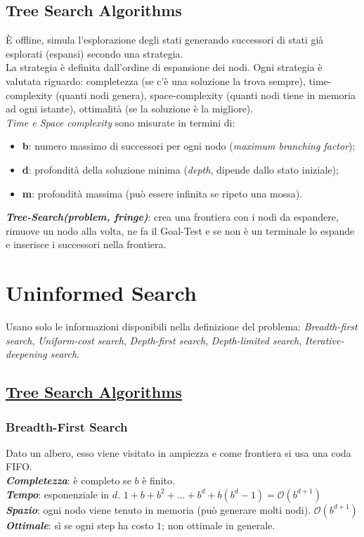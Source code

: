 \documentclass[a4paper, notitlepage, 9pt]{extreport}
\begin{document}
\section*{Tree Search Algorithms}
È offline, simula l'esplorazione degli stati generando successori di stati già esplorati (espansi) secondo una strategia.\\
La strategia è definita dall'ordine di espansione dei nodi. Ogni strategia è valutata riguardo: completezza (se c'è una soluzione la trova sempre), time-complexity (quanti nodi genera), space-complexity (quanti nodi tiene in memoria ad ogni istante), ottimalità (se la soluzione è la migliore).\\
\textit{Time e Space complexity} sono misurate in termini di:
\begin{itemize}
	\item \textbf{b}: numero massimo di successori per ogni nodo (\textit{maximum branching factor});
	\item \textbf{d}: profondità della soluzione minima (\textit{depth}, dipende dallo stato iniziale);
	\item \textbf{m}: profondità massima (può essere infinita se ripeto una mossa).
\end{itemize}
\textit{\textbf{Tree-Search(problem, fringe)}}: crea una frontiera con i nodi da espandere, rimuove un nodo alla volta, ne fa il Goal-Test e se non è un terminale lo espande e inserisce i successori nella frontiera.



\chapter*{Uninformed Search}
Usano solo le informazioni disponibili nella definizione del problema: \textit{Breadth-first search}, \textit{Uniform-cost search}, \textit{Depth-first search}, \textit{Depth-limited search}, \textit{Iterative-deepening search}.


\section*{\underline{Tree Search Algorithms}}

\subsection*{Breadth-First Search}
Dato un albero, esso viene visitato in ampiezza e come frontiera si usa una coda FIFO.\\
\textit{\textbf{Completezza}}: è completo se $b$ è finito.\\
\textit{\textbf{Tempo}}: esponenziale in $d$. $1 + b + b^2 + \dots + b^d + b(b^d -1) = \mathcal{O}(b^{d+1})$\\
\textit{\textbf{Spazio}}: ogni nodo viene tenuto in memoria (può generare molti nodi). $\mathcal{O}(b^{d+1})$\\
\textit{\textbf{Ottimale}}: sì se ogni step ha costo $1$; non ottimale in generale.
\end{document}
